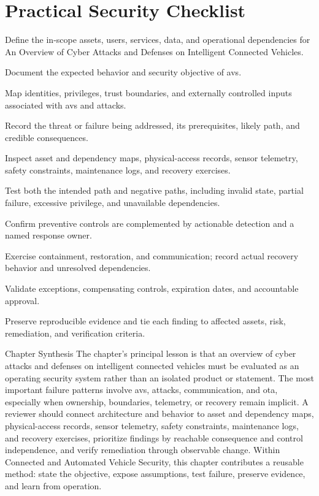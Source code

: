 \documentclass[11pt,letterpaper]{article}
\begin{document}
\section*{Practical Security Checklist}
\begin{CornellChecklist}
\item Define the in-scope assets, users, services, data, and operational dependencies for An Overview of Cyber Attacks and Defenses on Intelligent Connected Vehicles.
\item Document the expected behavior and security objective of avs.
\item Map identities, privileges, trust boundaries, and externally controlled inputs associated with avs and attacks.
\item Record the threat or failure being addressed, its prerequisites, likely path, and credible consequences.
\item Inspect asset and dependency maps, physical-access records, sensor telemetry, safety constraints, maintenance logs, and recovery exercises.
\item Test both the intended path and negative paths, including invalid state, partial failure, excessive privilege, and unavailable dependencies.
\item Confirm preventive controls are complemented by actionable detection and a named response owner.
\item Exercise containment, restoration, and communication; record actual recovery behavior and unresolved dependencies.
\item Validate exceptions, compensating controls, expiration dates, and accountable approval.
\item Preserve reproducible evidence and tie each finding to affected assets, risk, remediation, and verification criteria.
\end{CornellChecklist}
\begin{CornellSummaryBox}{Chapter Synthesis}
The chapter's principal lesson is that an overview of cyber attacks and defenses on intelligent connected vehicles must be evaluated as an operating security system rather than an isolated product or statement. The most important failure patterns involve avs, attacks, communication, and ota, especially when ownership, boundaries, telemetry, or recovery remain implicit. A reviewer should connect architecture and behavior to asset and dependency maps, physical-access records, sensor telemetry, safety constraints, maintenance logs, and recovery exercises, prioritize findings by reachable consequence and control independence, and verify remediation through observable change. Within Connected and Automated Vehicle Security, this chapter contributes a reusable method: state the objective, expose assumptions, test failure, preserve evidence, and learn from operation.
\end{CornellSummaryBox}
\end{document}
